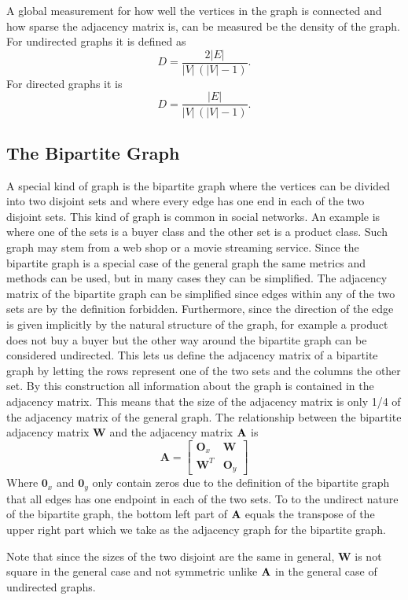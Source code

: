 A global measurement for how well the vertices in the graph is connected and how sparse the adjacency matrix is, can be measured be the density of the graph. For undirected graphs it is defined as\cite{density}
$$D =  \frac{2|E|}{|V|\,(|V|-1)}.$$
For directed graphs it is
$$D = \frac{|E|}{|V|\,(|V|-1)}.$$

\subsection{The Bipartite Graph}\label{subsec:bigraph}
A special kind of graph is the bipartite graph where the vertices can be divided into two disjoint sets and where every edge has one end in each of the two disjoint sets. This kind of graph is common in social networks. An example is where one of the sets is a buyer class and the other set is a product class. Such graph may stem from a web shop or a movie streaming service. Since the bipartite graph is a special case of the general graph \graph the same metrics and methods can be used, but in many cases they can be simplified. The adjacency matrix of the bipartite graph can be simplified since edges within any of the two sets are by the definition forbidden. Furthermore, since the direction of the edge is given implicitly by the natural structure of the graph, for example a product does not buy a buyer but the other way around the bipartite graph can be considered undirected. This lets us define the adjacency matrix of a bipartite graph by letting the rows represent one of the two sets and the columns the other set. By this construction all information about the graph is contained in the adjacency matrix. This means that the size of the adjacency matrix is only 1/4 of the adjacency matrix of the general graph. The relationship between the bipartite adjacency matrix $\textbf{W}$ and the adjacency matrix $\textbf{A}$ is
$$
\textbf{A} = \left[
\begin{matrix}
  \textbf{O}_x & \textbf{W} \\
  \textbf{W}^T & \textbf{O}_y
\end{matrix}
\right]
$$
Where $\textbf{0}_x$ and $\textbf{0}_y$ only contain zeros due to the definition of the bipartite graph that all edges has one endpoint in each of the two sets. To to the undirect nature of the bipartite graph, the bottom left part of $\textbf{A}$ equals the transpose of the upper right part which we take as the adjacency graph for the bipartite graph.

Note that since the sizes of the two disjoint are the same in general, $\textbf{W}$ is not square in the general case and not symmetric unlike $\textbf{A}$ in the general case of undirected graphs.

